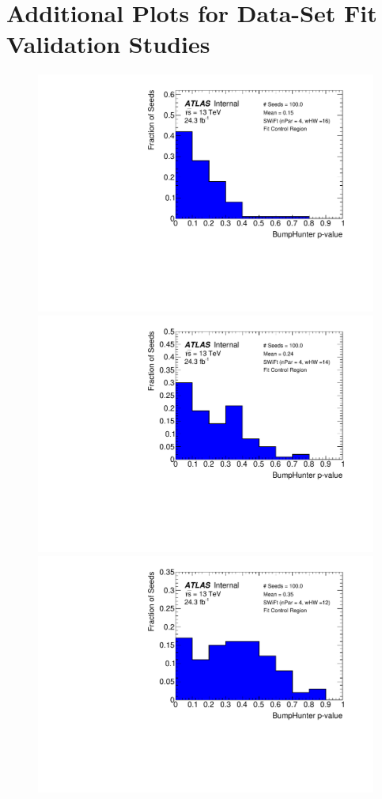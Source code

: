 \chapter{Additional Plots for \lm{} Data-Set Fit Validation Studies}
\label{app:lowMass_Swift}
\vspace{-3em}

\begin{figure}[!htb]
\captionsetup[subfigure]{aboveskip=0pt,justification=centering}
\centering
{} {
  \includegraphics[width=0.32\linewidth, angle=0]{figs/Dibjet/LowMass/FitStudy_min566/pVal_bumpHunter_corrFitCR_4para_low16_high16.pdf}
}\hspace{-3mm}                                       
 {                                                    
  \includegraphics[width=0.32\linewidth, angle=0]{figs/Dibjet/LowMass/FitStudy_min566/pVal_bumpHunter_corrFitCR_4para_low14_high14.pdf}
}\hspace{-3mm}                                       
 {                                                    
  \includegraphics[width=0.32\linewidth, angle=0]{figs/Dibjet/LowMass/FitStudy_min566/pVal_bumpHunter_corrFitCR_4para_low12_high12.pdf}
}\hspace{-3mm}                                       

\end{figure}

